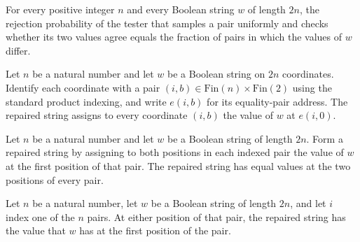 \begin{theorem}
\label{FABL.equalityPairStringTester_rejectionProbability}
\leanok
{}
For every positive integer $n$ and every Boolean string $w$ of length $2n$, the
rejection probability of the tester that samples a pair uniformly and checks whether its
two values agree equals the fraction of pairs in which the values of $w$ differ.
\end{theorem}

\begin{definition}
\label{FABL.equalityPairRepair}
\leanok
{}
Let $n$ be a natural number and let $w$ be a Boolean string on $2n$ coordinates.
Identify each coordinate with a pair $(i,b)\in\mathrm{Fin}(n)\times\mathrm{Fin}(2)$
using the standard product indexing, and write $e(i,b)$ for its equality-pair address.
The repaired string assigns to every coordinate $(i,b)$ the value of $w$ at $e(i,0)$.
\end{definition}

\begin{theorem}
\label{FABL.equalityPairRepair_mem}
\leanok
{}
Let $n$ be a natural number and let $w$ be a Boolean string of length $2n$. Form a
repaired string by assigning to both positions in each indexed pair the value of $w$ at
the first position of that pair. The repaired string has equal values at the two
positions of every pair.
\end{theorem}

\begin{theorem}
\label{FABL.equalityPairRepair_pair}
\leanok
{}
Let $n$ be a natural number, let $w$ be a Boolean string of length $2n$, and let $i$
index one of the $n$ pairs. At either position of that pair, the repaired string has the
value that $w$ has at the first position of the pair.
\end{theorem}

